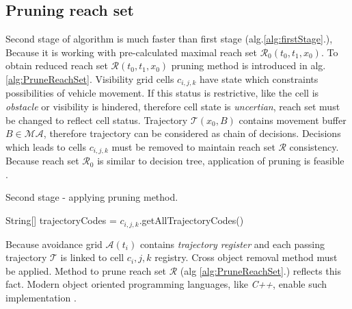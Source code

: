 \subsection{Pruning reach set}
\noindent Second stage of algorithm is much faster than first stage (alg.\ref{alg:firstStage}.), Because it is working with pre-calculated maximal reach set $\mathscr{R}_0(t_0,t_1,x_0)$. To obtain reduced reach set $\mathscr{R}(t_0,t_1,x_0)$ pruning method is introduced in alg. \ref{alg:PruneReachSet}. Visibility grid cells $c_{i,j,k}$ have state which constraints possibilities of vehicle movement. If this status is restrictive, like the cell is \textit{obstacle} or visibility is hindered, therefore cell state is \textit{uncertian}, reach set must be changed to reflect cell status. Trajectory $\mathscr{T}(x_0,B)$ contains movement buffer $B\in\mathscr{MA}$, therefore trajectory can be considered as chain of decisions. Decisions which leads to cells $c_{i,j,k}$ must be removed to maintain reach set $\mathscr{R}$ consistency. Because reach set $\mathscr{R}_0$ is similar to decision tree, application of pruning is feasible \cite{esposito1997comparative}.

\begin{algorithm}[H]
    \caption{Second stage - applying pruning method.}
    \label{alg:PruneReachSet}
    String[] trajectoryCodes = $c_{i,j,k}$.getAllTrajectoryCodes()\;
\end{algorithm}
\noindent Because avoidance grid $\mathscr{A}(t_i)$ contains \textit{trajectory register} and each passing trajectory $\mathscr{T}$ is linked to cell $c_i,j,k$ registry. Cross object removal method must be applied. Method to prune reach set $\mathscr{R}$ (alg \ref{alg:PruneReachSet}.)  reflects this fact. Modern object oriented programming languages, like \textit{C++}, enable such implementation \cite{hill1996object}.
	
